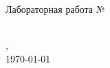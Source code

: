 \begin{center}   
	\large{Лабораторная работа № \labnumber\\ \hfill \break\Large{\textbf{\labwork}}}\\
    \normalsize
    \begin{flushright}
    \nameone, \groupone \\
    \today
    \end{flushright}
\end{center}
